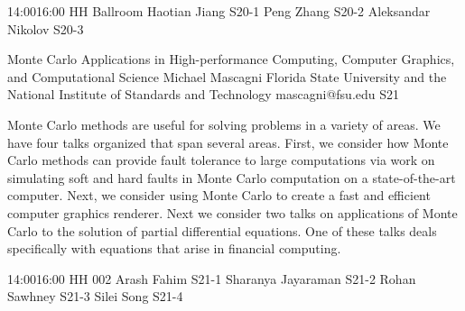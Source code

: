 \documentclass[12pt,lettersize,oneside]{book} %
\begin{document}

\sessionPart{}%
{\hfill{}
{14:00}{16:00} %
{HH Ballroom}} %
{Haotian Jiang}
{S20-1}
{Peng Zhang}
{S20-2}
{Aleksandar Nikolov}
{S20-3}



\clearpage

\begin{session}
 {Monte Carlo Applications in High-performance Computing, Computer Graphics, and Computational Science}%
 {Michael Mascagni}%
 {Florida State University and the National Institute of Standards and Technology}%
 {mascagni@fsu.edu}%
{}{}{}
 {S21}%
{}

 Monte Carlo methods are useful for solving problems in a variety of areas.  We have four talks organized that span several areas.  First,  we consider how Monte Carlo methods can provide fault tolerance to large computations via work on simulating soft and hard faults in Monte Carlo computation on a state-of-the-art computer.  Next, we consider using Monte Carlo to create a fast and efficient computer graphics renderer. Next we consider two talks on applications of Monte Carlo to the solution of partial differential equations.  One of these talks deals specifically with equations that arise in financial computing.
\end{session}



\sessionPart{}%
{\hfill{}
{14:00}{16:00} %
{HH 002}} %
{Arash Fahim}
{S21-1}
{Sharanya Jayaraman}
{S21-2}
{Rohan Sawhney}
{S21-3}
{Silei Song}
{S21-4}
\end{document}
